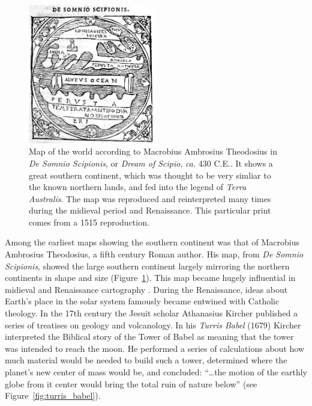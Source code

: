 \begin{figure}
\centering
\includegraphics[width=0.5\textwidth]{intro/figures/macrobius.jpg}
\caption[Map of the world according to Macrobius.]{Map of the world according to Macrobius Ambrosius Theodosius in \emph{De Somnio Scipionis}, or \emph{Dream of Scipio}, \emph{ca.} 430 C.E..
It shows a great southern continent, which was thought to be very simliar to the known northern lands, and fed into the legend of \emph{Terra Australis}.
The map was reproduced and reinterpreted many times during the midieval period and Renaissance. This particular print comes from a 1515 reproduction.}
\label{fig:macrobius}
\end{figure}

Among the earliest maps showing the southern continent was that of Macrobius Ambrosius Theodosius, a fifth
century Roman author. His map, from \emph{De Somnio Scipionis}, showed the large southern continent
largely mirroring the northern continents in shape and size (Figure~\ref{fig:macrobius}).
This map became hugely influential in midieval and Renaissance cartography \citep{stahl1942astronomy}.
During the Renaissance, ideas about Earth's place in the solar system famously became
entwined with Catholic theology. In the 17th century the Jesuit scholar Athanasius Kircher
published a series of treatises on geology and volcanology. In his \emph{Turris Babel} (1679)
Kircher interpreted the Biblical story of the Tower of Babel as meaning that 
the tower was intended to reach the moon. He performed a series of calculations
about how much material would be needed to build such a tower, determined where the planet's new
center of mass would be, and concluded:
``\ldots the motion of the earthly globe from it center would bring the total ruin of nature below'' (see Figure~\ref{fig:turris_babel}).


